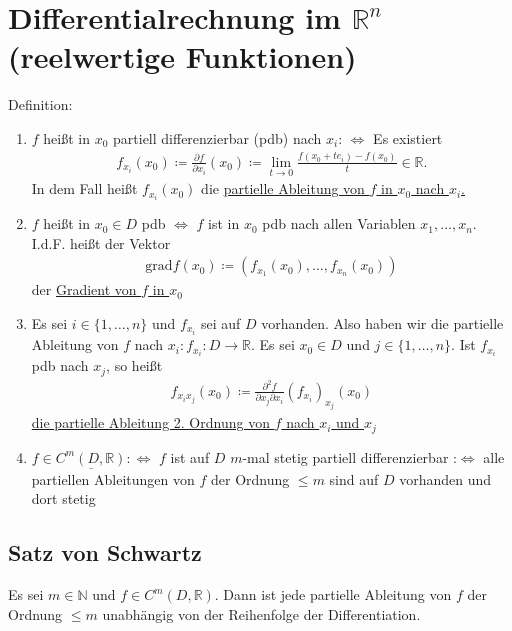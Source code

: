 \section{Differentialrechnung im $\mathbb{R}^n$ (reelwertige Funktionen)}
Definition:
\begin{enumerate}
    \item $f$ heißt in $x_0$ partiell differenzierbar (pdb) nach $x_i$: $\Leftrightarrow$
    Es existiert 
    \begin{align*}
        f_{x_i}(x_0) \coloneqq \frac{\partial f}{\partial x_i}(x_0) \coloneqq \lim \limits_{t \to 0} \frac{f(x_0 + te_i) - f(x_0)}{t} \in \mathbb{R}.
    \end{align*}
    In dem Fall heißt $f_{x_i}(x_0)$ die \underline{partielle Ableitung von $f$ in $x_0$ nach $x_i$.}
    \item $f$ heißt in $x_0 \in D$ pdb $\Leftrightarrow$ $f$ ist in $x_0$ pdb nach allen Variablen $x_1,\ldots,x_n$.
    I.d.F. heißt der Vektor
    \begin{align*}
        \text{grad} f(x_0) \coloneqq (f_{x_1}(x_0),\ldots,f_{x_n}(x_0))
    \end{align*}
    der \underline{Gradient von $f$ in $x_0$}
    \item Es sei $i \in \{1,\ldots,n\}$ und $f_{x_i}$ sei auf $D$ vorhanden. Also haben wir die partielle Ableitung von $f$ nach $x_i: f_{x_i}: D \to \mathbb{R}$.
    Es sei $x_0 \in D$ und $j \in \{1, \ldots,n \}$. Ist $f_{x_i}$ pdb nach $x_j$, so heißt
    \begin{align*}
        f_{x_ix_j}(x_0) \coloneqq \frac{\partial^2 f}{\partial x_j \partial x_i} (f_{x_i})_{x_j}(x_0)
    \end{align*}
    \underline{die partielle Ableitung 2. Ordnung von $f$ nach $x_i$ und $x_j$}
    \item $f \in \underline{C^m(D, \mathbb{R})} :\Leftrightarrow$ $f$ ist auf $D$ $m$-mal stetig partiell differenzierbar 
    :$\Leftrightarrow$ alle partiellen Ableitungen von $f$ der Ordnung $\leq m$ sind auf $D$ vorhanden und dort stetig
\end{enumerate}

\subsection{Satz von Schwartz}
\label{sec: Schwartz}
Es sei $m \in \mathbb{N}$ und $f \in C^m(D,\mathbb{R})$. Dann ist jede partielle Ableitung von $f$ der Ordnung $\leq m$
unabhängig von der Reihenfolge der Differentiation.

